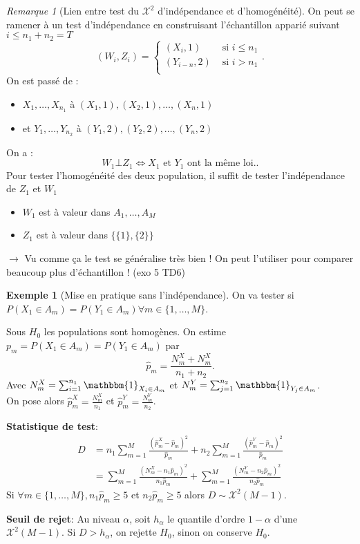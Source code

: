 \documentclass{article}
\theoremstyle{plain}%
\theoremstyle{definition}
\newtheorem{exmp}{Exemple}[section]
\theoremstyle{remark}
\newtheorem*{rem}{Remarque}
\begin{document}
\begin{rem}[Lien entre test du $ \mathcal{X}^2 $ d'indépendance et d'homogénéité]
    On peut se ramener à un test d'indépendance en construisant l'échantillon apparié suivant $ i \leq n_1 + n_2 = T $ 
    \[
        (W_i, Z_i) = \begin{cases}
        (X_i, 1) &\text{ si } i \leq n_1 \\
        (Y_{i-n}, 2) &\text{ si } i > n_1 \\
        \end{cases} 
    .\]
    On est passé de :\begin{itemize}
        \item $ X_1, \dots, X_{n_1} $ à $ (X_1,1), (X_2, 1), \dots, (X_n, 1) $ 
        \item et $ Y_1, \dots, Y_{n_2} $ à $ (Y_1,2), (Y_2, 2), \dots, (Y_n, 2) $ 
    \end{itemize}
    On a : 
    \[
        W_1 \bot Z_1 \Leftrightarrow X_1 \text{ et } Y_1 \text{ ont la même loi.}
    .\]
    Pour tester l'homogénéité des deux population, il suffit de tester l'indépendance de $ Z_1 $ et $ W_1 $ \begin{itemize}
        \item $ W_1 $ est à valeur dans $ A_1, \dots, A_M $ 
        \item $ Z_1 $ est à valeur dans $ \{\{1\}, \{2\}\} $ 
    \end{itemize}

    $\rightarrow$ Vu comme ça le test se généralise très bien ! On peut l'utiliser pour comparer beaucoup plus d'échantillon ! (exo 5 TD6)
\end{rem}

\begin{exmp}[Mise en pratique sans l'indépendance]
    On va tester si $ P(X_1 \in A_m) = P(Y_1 \in A_m) \forall m \in \{1,\dots, M\}$.

    Sous $ H_0 $ les populations sont homogènes. On estime $ p_m = P(X_1 \in A_m) = P(Y_1 \in A_m) $ par 
    \[
        \hat{p}_m = \frac{N_m^X + N_m^X}{n_1 + n_2}
    .\]
    Avec $ N_m^X = \sum_{i=1}^{n_1}\mathbbm{1}_{X_i \in A_m} $ et $ N_m^Y = \sum_{j=1}^{n_2}\mathbbm{1}_{Y_j \in A_m} $.\\
    On pose alors $ \hat{p}_m^X = \frac{N_m^X}{n_1} $ et $ \hat{p}_m^Y = \frac{N_m^Y}{n_2} $. 

    \textbf{Statistique de test}: 
    \begin{align*}
        D &= n_1 \sum_{m=1}^{M}\frac{(\hat{p}_m^X - \hat{p}_m)^2}{\hat{p}_m} + n_2 \sum_{m=1}^{M}\frac{(\hat{p}_m^Y - \hat{p}_m)^2}{\hat{p}_m} \\
            &= \sum_{m=1}^{M}\frac{(N_m^X - n_1 \hat{p}_m)^2}{n_1 \hat{p}_m} + \sum_{m=1}^{M}\frac{(N_m^Y - n_2 \hat{p}_m)^2}{n_2 \hat{p}_m}
    \end{align*}
    Si $ \forall m \in \{1, \dots, M\}, n_1 \hat{p}_m \geq 5$ et $ n_2 \hat{p}_m \geq 5 $ alors $ D \sim \mathcal{X}^2 (M-1) $.

    \textbf{Seuil de rejet}: Au niveau $ \alpha  $, soit $ h_\alpha  $ le quantile d'ordre $ 1-\alpha  $ d'une $ \mathcal{X}^2(M-1) $. Si $ D > h_\alpha  $, on rejette $ H_0 $, sinon on conserve $ H_0 $.
\end{exmp}
\end{document}
